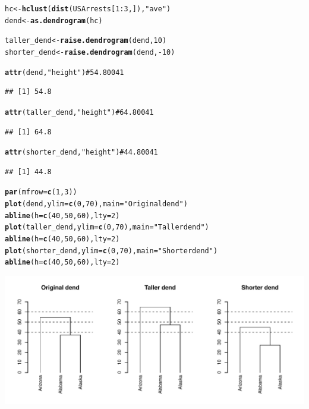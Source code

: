 \documentclass[shortnames,nojss,article]{jss}\usepackage{graphicx, color}
\makeatletter
\def\maxwidth{ %
  \ifdim\Gin@nat@width>\linewidth
    \linewidth
  \else
    \Gin@nat@width
  \fi
}
\newcommand{\hlfunctioncall}[1]{\textcolor[rgb]{0.501960784313725,0,0.329411764705882}{\textbf{#1}}}%
\newcommand{\hlstring}[1]{\textcolor[rgb]{0.6,0.6,1}{#1}}%
\newenvironment{kframe}{%
 \def\at@end@of@kframe{}%
 \ifinner\ifhmode%
  \def\at@end@of@kframe{\end{minipage}}%
  \begin{minipage}{\columnwidth}%
 \fi\fi%
 \def\FrameCommand##1{\hskip\@totalleftmargin \hskip-\fboxsep
 \colorbox{shadecolor}{##1}\hskip-\fboxsep
     \hskip-\linewidth \hskip-\@totalleftmargin \hskip\columnwidth}%
 \MakeFramed {\advance\hsize-\width
   \@totalleftmargin\z@ \linewidth\hsize
   \@setminipage}}%
 {\par\unskip\endMakeFramed%
 \at@end@of@kframe}
\newenvironment{knitrout}{}{} %
\makeatother
\begin{document}
\begin{knitrout}
\color{fgcolor}\begin{kframe}
\begin{alltt}

hc <- \hlfunctioncall{hclust}(\hlfunctioncall{dist}(USArrests[1:3, ]), \hlstring{"ave"})
dend <- \hlfunctioncall{as.dendrogram}(hc)

taller_dend <- \hlfunctioncall{raise.dendrogram}(dend, 10)
shorter_dend <- \hlfunctioncall{raise.dendrogram}(dend, -10)

\hlfunctioncall{attr}(dend, \hlstring{"height"})  # 54.80041
\end{alltt}
\begin{verbatim}
## [1] 54.8
\end{verbatim}
\begin{alltt}
\hlfunctioncall{attr}(taller_dend, \hlstring{"height"})  # 64.80041
\end{alltt}
\begin{verbatim}
## [1] 64.8
\end{verbatim}
\begin{alltt}
\hlfunctioncall{attr}(shorter_dend, \hlstring{"height"})  # 44.80041
\end{alltt}
\begin{verbatim}
## [1] 44.8
\end{verbatim}
\begin{alltt}

\hlfunctioncall{par}(mfrow = \hlfunctioncall{c}(1, 3))
\hlfunctioncall{plot}(dend, ylim = \hlfunctioncall{c}(0, 70), main = \hlstring{"Original dend"})
\hlfunctioncall{abline}(h = \hlfunctioncall{c}(40, 50, 60), lty = 2)
\hlfunctioncall{plot}(taller_dend, ylim = \hlfunctioncall{c}(0, 70), main = \hlstring{"Taller dend"})
\hlfunctioncall{abline}(h = \hlfunctioncall{c}(40, 50, 60), lty = 2)
\hlfunctioncall{plot}(shorter_dend, ylim = \hlfunctioncall{c}(0, 70), main = \hlstring{"Shorter dend"})
\hlfunctioncall{abline}(h = \hlfunctioncall{c}(40, 50, 60), lty = 2)
\end{alltt}
\end{kframe}

{\centering \includegraphics[width=\maxwidth]{figure/unnamed-chunk-23} 

}



\end{knitrout}
\end{document}
